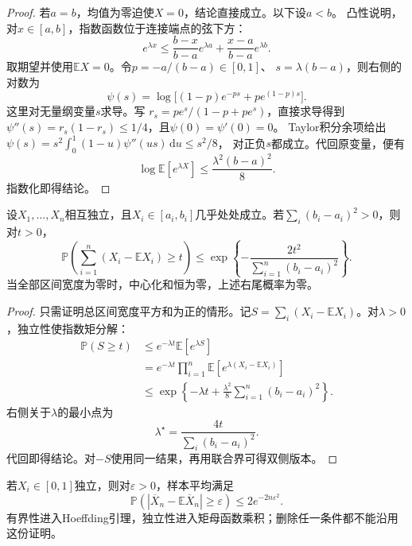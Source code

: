 \begin{proof}
若\(a=b\)，均值为零迫使\(X=0\)，结论直接成立。以下设\(a<b\)。
凸性说明，对\(x\in[a,b]\)，指数函数位于连接端点的弦下方：
\[ e^{\lambda x}
  \leq\frac{b-x}{b-a}e^{\lambda a}+\frac{x-a}{b-a}e^{\lambda b}. \]
取期望并使用\(\mathbb{E}X=0\)。令\(p=-a/(b-a)\in[0,1]\)、
\(s=\lambda(b-a)\)，则右侧的对数为
\[
 \psi(s)=\log\bigl[(1-p)e^{-ps}+pe^{(1-p)s}\bigr].
\]
这里对无量纲变量\(s\)求导。写
\(r_s=pe^s/(1-p+pe^s)\)，直接求导得到
\(\psi''(s)=r_s(1-r_s)\leq1/4\)，且\(\psi(0)=\psi'(0)=0\)。
Taylor积分余项给出
\(\psi(s)=s^2\int_0^1(1-u)\psi''(us)\,\mathrm du\leq s^2/8\)，
对正负\(s\)都成立。代回原变量，便有
\[ \log\mathbb{E}[e^{\lambda X}]
  \leq\frac{\lambda^2(b-a)^2}{8}. \]
指数化即得结论。
\end{proof}

\begin{theorem}[Hoeffding不等式]
\label{thm:probability-hoeffding-inequality}
设\(X_1,\ldots,X_n\)相互独立，且\(X_i\in[a_i,b_i]\)几乎处处成立。若\(\sum_i(b_i-a_i)^2>0\)，则对\(t>0\)，
\[
  \mathbb{P}\left(
    \sum_{i=1}^{n}(X_i-\mathbb{E}X_i)\geq t
  \right)
  \leq
  \exp\left\{
    -\frac{2t^2}{\sum_{i=1}^{n}(b_i-a_i)^2}
  \right\}.
\]
当全部区间宽度为零时，中心化和恒为零，上述右尾概率为零。
\end{theorem}

\begin{proof}
只需证明总区间宽度平方和为正的情形。记\(S=\sum_i(X_i-\mathbb{E}X_i)\)。对\(\lambda>0\)，独立性使指数矩分解：
\[
\begin{aligned}
  \mathbb{P}(S\geq t)
  &\leq
  e^{-\lambda t}\mathbb{E}[e^{\lambda S}]\\
  &=
  e^{-\lambda t}
  \prod_{i=1}^{n}
  \mathbb{E}\left[
    e^{\lambda(X_i-\mathbb{E}X_i)}
  \right]\\
  &\leq
  \exp\left\{
    -\lambda t+
    \frac{\lambda^2}{8}
    \sum_{i=1}^{n}(b_i-a_i)^2
  \right\}.
\end{aligned}
\]
右侧关于\(\lambda\)的最小点为
\[ \lambda^\star
  =\frac{4t}{\sum_i(b_i-a_i)^2}. \]
代回即得结论。对\(-S\)使用同一结果，再用联合界可得双侧版本。
\end{proof}

若\(X_i\in[0,1]\)独立，则对\(\varepsilon>0\)，样本平均满足
\[ \mathbb{P}(|\overline{X}_n-\mathbb{E}\overline{X}_n|
  \geq\varepsilon)\leq 2e^{-2n\varepsilon^2}. \]
有界性进入Hoeffding引理，独立性进入矩母函数乘积；删除任一条件都不能沿用这份证明。

